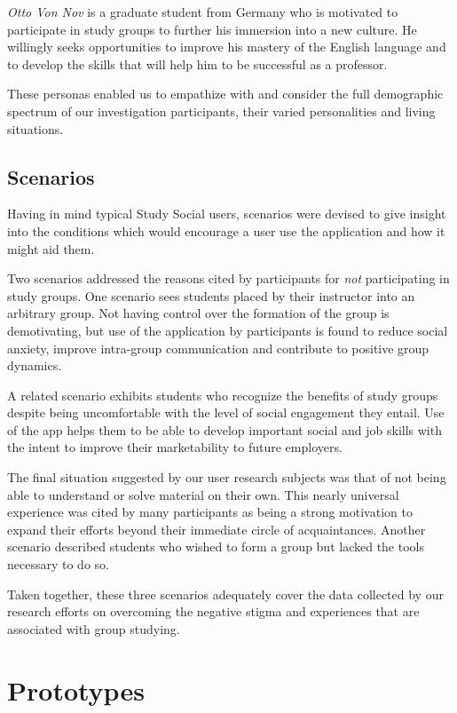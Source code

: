 \documentclass{sigchi-ext}
\begin{document}
\textit{Otto Von Nov} is a graduate student from Germany who is motivated to
participate in study groups to further his immersion into a new culture.  He
willingly seeks opportunities to improve his mastery of the English language
and to develop the skills that will help him to be successful as a professor.

These personas enabled us to empathize with and consider the full demographic
spectrum of our investigation participants, their varied personalities and
living situations.

\subsection{Scenarios}

Having in mind typical Study Social users, scenarios were devised to give
insight into the conditions which would encourage a user use the application
and how it might aid them.

Two scenarios addressed the reasons cited by participants for \textit{not}
participating in study groups. One scenario sees students placed by their
instructor into an arbitrary group. Not having control over the formation of
the group is demotivating, but use of the application by participants is found
to reduce social anxiety, improve intra-group communication and contribute to
positive group dynamics.

A related scenario exhibits students who recognize the benefits of study groups
despite being uncomfortable with the level of social engagement they entail.
Use of the app helps them to be able to develop important social and job skills
with the intent to improve their marketability to future employers.

The final situation suggested by our user research subjects was that of not
being able to understand or solve material on their own. This nearly universal
experience was cited by many participants as being a strong motivation to
expand their efforts beyond their immediate circle of acquaintances.  Another
scenario described students who wished to form a group but lacked the tools
necessary to do so. 

Taken together, these three scenarios adequately cover the data collected by
our research efforts on overcoming the negative stigma and experiences that are
associated with group studying.



\section{Prototypes}
\end{document}
